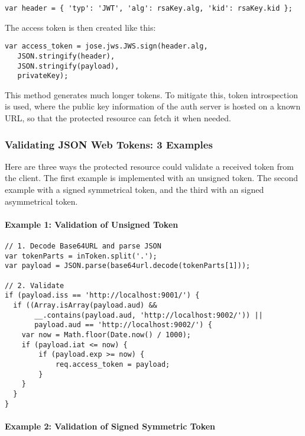 \begin{verbatim}
var header = { 'typ': 'JWT', 'alg': rsaKey.alg, 'kid': rsaKey.kid };
\end{verbatim}

The access token is then created like this:

\begin{verbatim}
var access_token = jose.jws.JWS.sign(header.alg,
   JSON.stringify(header),
   JSON.stringify(payload),
   privateKey);
\end{verbatim}

This method generates much longer tokens. To mitigate this, token introspection is used, where the public key information of the auth server is hosted on a known URL, so that the protected resource can fetch it when needed.

\subsubsection{Validating JSON Web Tokens: 3 Examples}

Here are three ways the protected resource could validate a received token from the client. The first example is implemented with an unsigned token. The second example with a signed symmetrical token, and the third with an signed asymmetrical token.

\paragraph{Example 1: Validation of Unsigned Token}

\begin{verbatim}
// 1. Decode Base64URL and parse JSON
var tokenParts = inToken.split('.');
var payload = JSON.parse(base64url.decode(tokenParts[1]));

// 2. Validate
if (payload.iss == 'http://localhost:9001/') {
  if ((Array.isArray(payload.aud) &&
       __.contains(payload.aud, 'http://localhost:9002/')) ||
       payload.aud == 'http://localhost:9002/') {
    var now = Math.floor(Date.now() / 1000);
    if (payload.iat <= now) {
        if (payload.exp >= now) {
            req.access_token = payload;
        }
    }
  }
}
\end{verbatim}

\paragraph{Example 2: Validation of Signed Symmetric Token}

